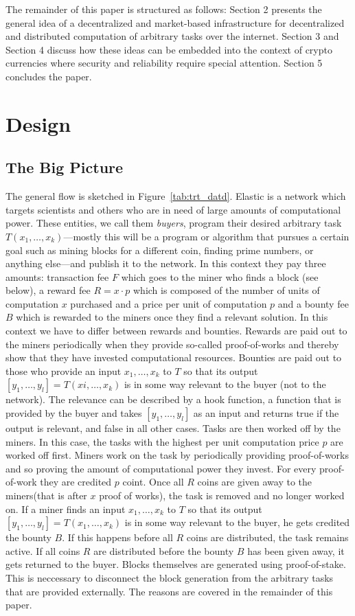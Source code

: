 \documentclass{sig-alternate}
\begin{document}
The remainder of this paper is structured as follows:
Section 2 presents the general idea of a decentralized and market-based infrastructure for decentralized and distributed computation of arbitrary tasks over the internet. Section 3 and Section 4 discuss how these ideas can be embedded into the context of crypto currencies where security and reliability require special attention. Section 5 concludes the paper.
\section{Design}

\subsection{The Big Picture}
\label{bigpic}
The general flow is sketched in Figure~\ref{tab:trt_datd}.
Elastic is a network which targets scientists and others who are in need of large amounts of computational power. These entities, we call them \emph{buyers}, program their desired arbitrary task $T(x_1,\ldots,x_k)$---mostly this will be a program or algorithm that pursues a certain goal such as mining blocks for a different coin, finding prime numbers, or anything else---and publish it to the network. In this context they pay three amounts: transaction fee $F$ which goes to the miner who finds a block (see below), a reward fee $R = x \cdot p$ which is composed of the number of units of computation $x$ purchased and a price per unit of computation $p$ and a bounty fee $B$ which is rewarded to the miners once they find a relevant solution. In this context we have to differ between rewards and bounties. Rewards are paid out to the miners periodically when they provide so-called proof-of-works and thereby show that they have invested computational resources.
Bounties are paid out to those who provide an input $x_1,\ldots,x_k$ to $T$ so that its output $[y_1,\ldots,y_l] = T(xi,\ldots,x_k)$ is in some way relevant to the buyer (not to the network). The relevance can be described by a hook function, a function that is provided by the buyer and takes $[y_1,\ldots,y_l]$ as an input and returns true if the output is relevant, and false in all other cases.
Tasks are then worked off by the miners. In this case, the tasks with the highest per unit computation price $p$ are worked off first. Miners work on the task by periodically providing proof-of-works and so proving the amount of computational power they invest. For every proof-of-work they are credited $p$ coint. Once all $R$ coins are given away to the miners(that is after $x$ proof of works), the task is removed and no longer worked on. If a miner finds an input $x_1,\ldots,x_k$ to $T$ so that its output $[y_1,\ldots,y_l] = T(x_1,\ldots,x_k)$ is in some way relevant to the buyer, he gets credited the bounty $B$. If this happens before all $R$ coins are distributed, the task remains active. If all coins $R$ are distributed before the bounty $B$ has been given away, it gets returned to the buyer.
Blocks themselves are generated using proof-of-stake. This is neccessary to disconnect the block generation from the arbitrary tasks that are provided externally. The reasons are covered in the remainder of this paper.
\end{document}
